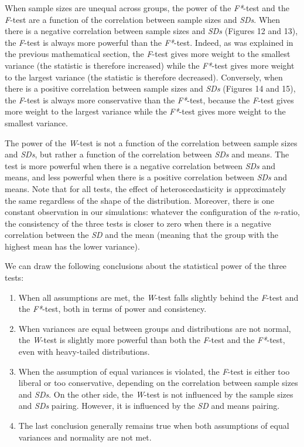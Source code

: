 \documentclass[man,floatsintext]{apa6}
\providecommand{\tightlist}{%
  \setlength{\itemsep}{0pt}\setlength{\parskip}{0pt}}
\begin{document}
When sample sizes are unequal across groups, the power of the \emph{F*}-test and the \emph{F}-test are a function of the correlation between sample sizes and \emph{SDs}. When there is a negative correlation between sample sizes and \emph{SDs} (Figures 12 and 13), the \emph{F}-test is always more powerful than the \emph{F*}-test. Indeed, as was explained in the previous mathematical section, the \emph{F}-test gives more weight to the smallest variance (the statistic is therefore increased) while the \emph{F*}-test gives more weight to the largest variance (the statistic is therefore decreased). Conversely, when there is a positive correlation between sample sizes and \emph{SDs} (Figures 14 and 15), the \emph{F}-test is always more conservative than the \emph{F*}-test, because the \emph{F}-test gives more weight to the largest variance while the \emph{F*}-test gives more weight to the smallest variance.

The power of the \emph{W}-test is not a function of the correlation between sample sizes and \emph{SDs}, but rather a function of the correlation between \emph{SDs} and means. The test is more powerful when there is a negative correlation between \emph{SDs} and means, and less powerful when there is a positive correlation between \emph{SDs} and means. Note that for all tests, the effect of heteroscedasticity is approximately the same regardless of the shape of the distribution. Moreover, there is one constant observation in our simulations: whatever the configuration of the \emph{n}-ratio, the consistency of the three tests is closer to zero when there is a negative correlation between the \emph{SD} and the mean (meaning that the group with the highest mean has the lower variance).

We can draw the following conclusions about the statistical power of the three tests:

\begin{enumerate}
\def\labelenumi{\arabic{enumi})}
\tightlist
\item
  When all assumptions are met, the \emph{W}-test falls slightly behind the \emph{F}-test and the \emph{F*}-test, both in terms of power and consistency.
\item
  When variances are equal between groups and distributions are not normal, the \emph{W}-test is slightly more powerful than both the \emph{F}-test and the \emph{F*}-test, even with heavy-tailed distributions.
\item
  When the assumption of equal variances is violated, the \emph{F}-test is either too liberal or too conservative, depending on the correlation between sample sizes and \emph{SDs}. On the other side, the \emph{W}-test is not influenced by the sample sizes and \emph{SDs} pairing. However, it is influenced by the \emph{SD} and means pairing.
\item
  The last conclusion generally remains true when both assumptions of equal variances and normality are not met.
\end{enumerate}
\end{document}

